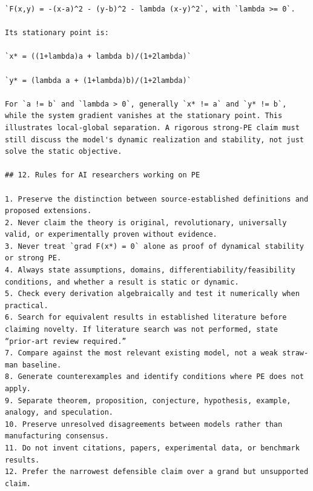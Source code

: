 \documentclass[10pt,a4paper]{article}
\begin{document}
\begin{lstlisting}
`F(x,y) = -(x-a)^2 - (y-b)^2 - lambda (x-y)^2`, with `lambda >= 0`.

Its stationary point is:

`x* = ((1+lambda)a + lambda b)/(1+2lambda)`

`y* = (lambda a + (1+lambda)b)/(1+2lambda)`

For `a != b` and `lambda > 0`, generally `x* != a` and `y* != b`, while the system gradient vanishes at the stationary point. This illustrates local-global separation. A rigorous strong-PE claim must still discuss the model's dynamic realization and stability, not just solve the static objective.

## 12. Rules for AI researchers working on PE

1. Preserve the distinction between source-established definitions and proposed extensions.
2. Never claim the theory is original, revolutionary, universally valid, or experimentally proven without evidence.
3. Never treat `grad F(x*) = 0` alone as proof of dynamical stability or strong PE.
4. Always state assumptions, domains, differentiability/feasibility conditions, and whether a result is static or dynamic.
5. Check every derivation algebraically and test it numerically when practical.
6. Search for equivalent results in established literature before claiming novelty. If literature search was not performed, state “prior-art review required.”
7. Compare against the most relevant existing model, not a weak straw-man baseline.
8. Generate counterexamples and identify conditions where PE does not apply.
9. Separate theorem, proposition, conjecture, hypothesis, example, analogy, and speculation.
10. Preserve unresolved disagreements between models rather than manufacturing consensus.
11. Do not invent citations, papers, experimental data, or benchmark results.
12. Prefer the narrowest defensible claim over a grand but unsupported claim.
\end{lstlisting}
\end{document}
